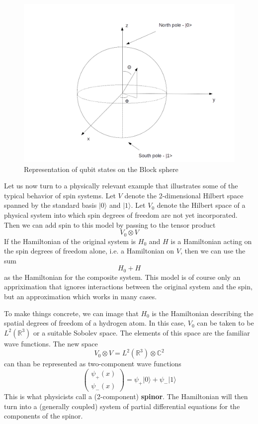 \documentclass[a4paper, draft]{article}
\theoremstyle{own}
\theoremstyle{remark}
\newcommand{\R}{\mathbb{R}}
\newcommand{\C}{\mathbb{C}}
\begin{document}
\begin{figure}[ht]
\centering
\includegraphics[width=0.9\linewidth]{images/BlochSphere}
\caption[Representation of qubit states on the Block sphere]{Representation of qubit states on the Block sphere}
\label{fig:BlochSphere}
\end{figure}

Let us now turn to a physically relevant example that illustrates some of the typical behavior of spin systems. Let $V$ denote the 2-dimensional Hilbert space spanned by the standard basis $|0 \rangle$ and $|1 \rangle$. Let $V_0$ denote the Hilbert space of a physical system into which spin degrees of freedom are not yet incorporated. Then we can add spin to this model by passing to the tensor product
$$
V_0 \otimes V
$$
If the Hamiltonian of the original system is $H_0$ and $H$ is a Hamiltonian acting on the spin degrees of freedom alone, i.e. a Hamiltonian on $V$, then we can use the sum
$$
H_0 + H
$$
as the Hamiltonian for the composite system. This model is of course only an appriximation that ignores interactions between the original system and the spin, but an approximation which works in many cases. 

To make things concrete, we can image that $H_0$ is the Hamiltonian describing the spatial degrees of freedom of a hydrogen atom. In this case, $V_0$ can be taken to be $L^2(\R^3)$ or a suitable Sobolev space. The elements of this space are the familiar wave functions. The new space 
$$
V_0 \otimes V = L^2(\R^3) \otimes \C^2
$$
can than be represented as two-component wave functions
$$
\begin{pmatrix}
\psi_+(x) \\
\psi_-(x)
\end{pmatrix}
=
\psi_+ |0 \rangle + \psi_- | 1\rangle
$$
This is what physicists call a (2-component) {\bf spinor}. The Hamiltonian will then turn into a (generally coupled) system of partial differential equations for the components of the spinor.
\end{document}
